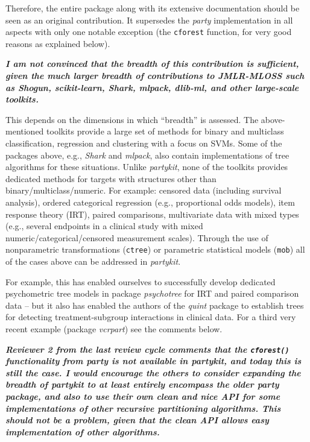 \documentclass{article}
\begin{document}
Therefore, the entire package along with its extensive documentation should be
seen as an original contribution. It supersedes the \emph{party} implementation
in all aspects with only one notable exception (the \texttt{cforest} function,
for very good reasons as explained below).

\smallskip

\textbf{\textit{%
I am not convinced that the breadth of this contribution is sufficient, given the much larger breadth of
contributions to JMLR-MLOSS such as Shogun, scikit-learn, Shark, mlpack, dlib-ml, and other large-scale toolkits.
}}

\smallskip

This depends on the dimensions in which ``breadth'' is assessed. The above-mentioned
toolkits provide a large set of methods for binary and multiclass classification, regression
and clustering with a focus on SVMs. Some of the packages above, e.g., \emph{Shark} and \emph{mlpack}, also
contain implementations of tree algorithms for these situations.  Unlike
\emph{partykit}, none of the toolkits provides dedicated methods for targets
with structures other than binary/multiclass/numeric. For example: censored data (including survival analysis), ordered
categorical regression (e.g., proportional odds models), item response theory (IRT),
paired comparisons, multivariate data with mixed types (e.g., several endpoints in a clinical study
with mixed numeric/categorical/censored measurement scales). Through the use
of nonparametric transformations (\texttt{ctree}) or parametric statistical models (\texttt{mob})
all of the cases above can be addressed in \emph{partykit}.

For example, this has enabled ourselves to successfully develop dedicated psychometric
tree models in package \emph{psychotree} for IRT and paired comparison data -- but it also
has enabled the authors of the \emph{quint} package to establish trees for detecting
treatment-subgroup interactions in clinical data. For a third very recent example
(package \emph{vcrpart}) see the comments below.


\smallskip

\textbf{\textit{%
Reviewer 2 from the last review cycle comments that the \texttt{cforest()}
functionality from party is not available in partykit, and today this is
still the case.  I would encourage the others to consider expanding the
breadth of partykit to at least entirely encompass the older party package,
and also to use their own clean and nice API for some implementations of
other recursive partitioning algorithms.  This should not be a problem,
given that the clean API allows easy implementation of other algorithms.
}}
\end{document}
